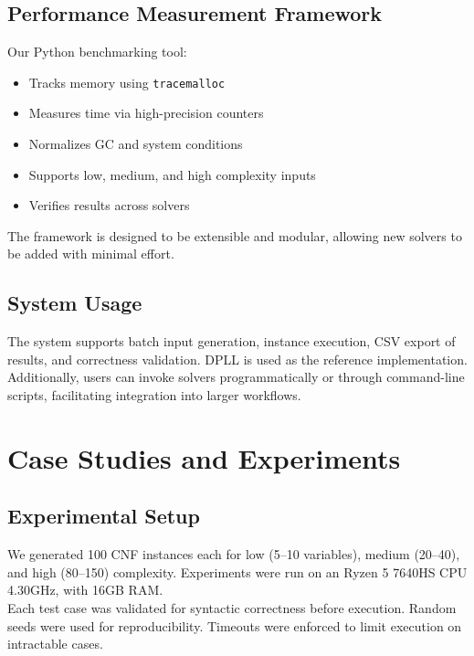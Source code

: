 \documentclass[11pt]{article}
\begin{document}
\subsection{Performance Measurement Framework}
Our Python benchmarking tool:
\begin{itemize}
  \item Tracks memory using \texttt{tracemalloc}
  \item Measures time via high-precision counters
  \item Normalizes GC and system conditions
  \item Supports low, medium, and high complexity inputs
  \item Verifies results across solvers
\end{itemize}

The framework is designed to be extensible and modular, allowing new solvers to be added with minimal effort.

\subsection{System Usage}
\hspace*{2em}
The system supports batch input generation, instance execution, CSV export of results, and correctness validation. DPLL is used as the reference implementation.\\
\hspace*{2em}
Additionally, users can invoke solvers programmatically or through command-line scripts, facilitating integration into larger workflows.

\section{Case Studies and Experiments}

\subsection{Experimental Setup}
\hspace*{2em}
We generated 100 CNF instances each for low (5--10 variables), medium (20--40), and high (80--150) complexity. Experiments were run on an Ryzen 5 7640HS CPU 4.30GHz, with 16GB RAM.\\
\hspace*{2em}
Each test case was validated for syntactic correctness before execution. Random seeds were used for reproducibility. Timeouts were enforced to limit execution on intractable cases.
\end{document}
